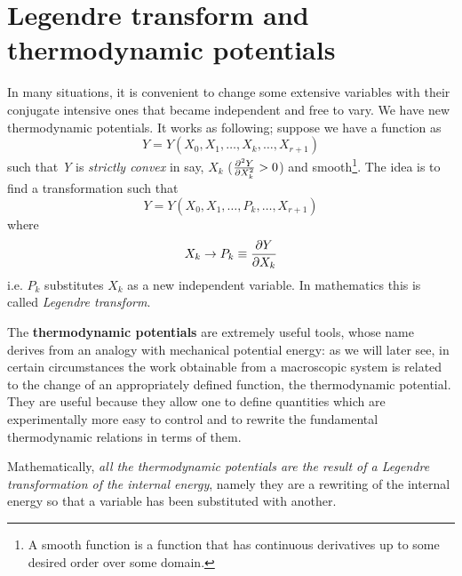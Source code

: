 \documentclass[../main/main.tex]{subfiles}
\begin{document}
\section{Legendre transform and thermodynamic potentials}

In many situations, it is convenient to change some extensive variables with their conjugate intensive ones that became independent and free to vary. We have new thermodynamic potentials.
It works as following; suppose we have a function as
\begin{equation}
  Y=Y(X_0,X_1,\dots,X_k,\dots,X_{r+1})
\end{equation}
such that \emph{Y} is \emph{strictly convex} in say, \( X_k \) (\( \pdv[2]{Y}{X_k} > 0 \)) and smooth\footnote{A smooth function is a function that has continuous derivatives up to some desired order over some domain.}.
The idea is to find a transformation such that 
\begin{equation}
Y=Y(X_0,X_1,\dots,P_k,\dots,X_{r+1}) 
\end{equation}
where
\begin{equation}
  X_k \rightarrow P_k \equiv \pdv{Y}{X_k}
\end{equation}
i.e. \( P_k \) substitutes \( X_k \) as a new independent variable.
In mathematics this is called \textit{Legendre transform}.


The \textbf{thermodynamic potentials} are extremely useful tools, whose name derives from an analogy with mechanical potential energy: as we will later see, in certain circumstances the work obtainable from a macroscopic system is related to the change of an appropriately defined function, the thermodynamic potential. They are useful because they allow one to define quantities which are experimentally more easy to control and to rewrite the fundamental thermodynamic relations in terms of them.

Mathematically, \emph{all the thermodynamic potentials are the result of a Legendre transformation of the internal energy}, namely they are a rewriting of the internal energy so that a variable has been substituted with another.
\end{document}
